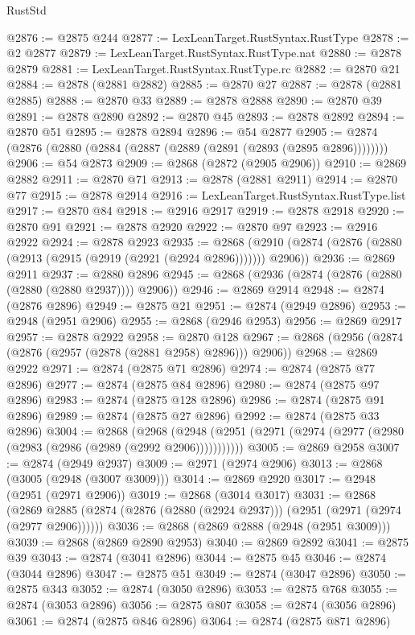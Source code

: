 \begin{lexlean}{RustStd}
\begin{coremodule}
{\begin{coremodule}
{{{{{{{{{{{{{{{{{{{{{{{{{{{{{{{{{{{{{{{{{{{{{{{{{{{{{{{{{{{{{{{{{{{{{{{{{{{{{{{{{{{{{@2876 := @2875 @244
@2877 := LexLeanTarget.RustSyntax.RustType
@2878 := @2 @2877
@2879 := LexLeanTarget.RustSyntax.RustType.nat
@2880 := @2878 @2879
@2881 := LexLeanTarget.RustSyntax.RustType.rc
@2882 := @2870 @21
@2884 := @2878 (@2881 @2882)
@2885 := @2870 @27
@2887 := @2878 (@2881 @2885)
@2888 := @2870 @33
@2889 := @2878 @2888
@2890 := @2870 @39
@2891 := @2878 @2890
@2892 := @2870 @45
@2893 := @2878 @2892
@2894 := @2870 @51
@2895 := @2878 @2894
@2896 := @54 @2877
@2905 := @2874 (@2876 (@2880 (@2884 (@2887 (@2889 (@2891 (@2893 (@2895 @2896))))))))
@2906 := @54 @2873
@2909 := @2868 (@2872 (@2905 @2906))
@2910 := @2869 @2882
@2911 := @2870 @71
@2913 := @2878 (@2881 @2911)
@2914 := @2870 @77
@2915 := @2878 @2914
@2916 := LexLeanTarget.RustSyntax.RustType.list
@2917 := @2870 @84
@2918 := @2916 @2917
@2919 := @2878 @2918
@2920 := @2870 @91
@2921 := @2878 @2920
@2922 := @2870 @97
@2923 := @2916 @2922
@2924 := @2878 @2923
@2935 := @2868 (@2910 (@2874 (@2876 (@2880 (@2913 (@2915 (@2919 (@2921 (@2924 @2896))))))) @2906))
@2936 := @2869 @2911
@2937 := @2880 @2896
@2945 := @2868 (@2936 (@2874 (@2876 (@2880 (@2880 (@2880 @2937)))) @2906))
@2946 := @2869 @2914
@2948 := @2874 (@2876 @2896)
@2949 := @2875 @21
@2951 := @2874 (@2949 @2896)
@2953 := @2948 (@2951 @2906)
@2955 := @2868 (@2946 @2953)
@2956 := @2869 @2917
@2957 := @2878 @2922
@2958 := @2870 @128
@2967 := @2868 (@2956 (@2874 (@2876 (@2957 (@2878 (@2881 @2958) @2896))) @2906))
@2968 := @2869 @2922
@2971 := @2874 (@2875 @71 @2896)
@2974 := @2874 (@2875 @77 @2896)
@2977 := @2874 (@2875 @84 @2896)
@2980 := @2874 (@2875 @97 @2896)
@2983 := @2874 (@2875 @128 @2896)
@2986 := @2874 (@2875 @91 @2896)
@2989 := @2874 (@2875 @27 @2896)
@2992 := @2874 (@2875 @33 @2896)
@3004 := @2868
    (@2968 (@2948 (@2951 (@2971 (@2974 (@2977 (@2980 (@2983 (@2986 (@2989 (@2992 @2906)))))))))))
@3005 := @2869 @2958
@3007 := @2874 (@2949 @2937)
@3009 := @2971 (@2974 @2906)
@3013 := @2868 (@3005 (@2948 (@3007 @3009)))
@3014 := @2869 @2920
@3017 := @2948 (@2951 (@2971 @2906))
@3019 := @2868 (@3014 @3017)
@3031 := @2868
    (@2869 @2885 (@2874 (@2876 (@2880 (@2924 @2937))) (@2951 (@2971 (@2974 (@2977 @2906))))))
@3036 := @2868 (@2869 @2888 (@2948 (@2951 @3009)))
@3039 := @2868 (@2869 @2890 @2953)
@3040 := @2869 @2892
@3041 := @2875 @39
@3043 := @2874 (@3041 @2896)
@3044 := @2875 @45
@3046 := @2874 (@3044 @2896)
@3047 := @2875 @51
@3049 := @2874 (@3047 @2896)
@3050 := @2875 @343
@3052 := @2874 (@3050 @2896)
@3053 := @2875 @768
@3055 := @2874 (@3053 @2896)
@3056 := @2875 @807
@3058 := @2874 (@3056 @2896)
@3061 := @2874 (@2875 @846 @2896)
@3064 := @2874 (@2875 @871 @2896)
}}}}}}}}}}}}}}}}}}}}}}}}}}}}}}}}}}}}}}}}}}}}}}}}}}}}}}}}}}}}}}}}}}}}}}}}}}}}}}}}}}}}}
\end{coremodule}}
\end{coremodule}
\end{lexlean}
